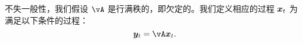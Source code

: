 \documentclass[../../book-main.tex]{subfiles}
\begin{document}


不失一般性，我们假设 $\vA$ 是行满秩的，即欠定的。我们定义相应的过程 $\bm{x}_t$ 为满足以下条件的过程：
\begin{equation}
\y_t = \vA \x_t.   
\end{equation}
\end{document}
